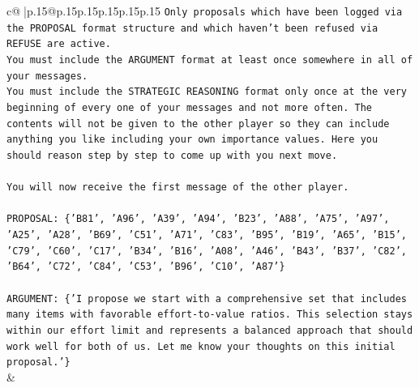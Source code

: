 \documentclass{article}
\begin{document}
{\begin{supertabular}{c@{$\;$}|p{.15\linewidth}@{}p{.15\linewidth}p{.15\linewidth}p{.15\linewidth}p{.15\linewidth}p{.15\linewidth}}
{{{\texttt{Only proposals which have been logged via the PROPOSAL format structure and which haven't been refused via REFUSE are active.} \\
\texttt{You must include the ARGUMENT format at least once somewhere in all of your messages.} \\
\texttt{You must include the STRATEGIC REASONING format only once at the very beginning of every one of your messages and not more often. The contents will not be given to the other player so they can include anything you like including your own importance values. Here you should reason step by step to come up with you next move.} \\
\\ 
\texttt{You will now receive the first message of the other player.} \\
\\ 
\texttt{PROPOSAL: \{'B81', 'A96', 'A39', 'A94', 'B23', 'A88', 'A75', 'A97', 'A25', 'A28', 'B69', 'C51', 'A71', 'C83', 'B95', 'B19', 'A65', 'B15', 'C79', 'C60', 'C17', 'B34', 'B16', 'A08', 'A46', 'B43', 'B37', 'C82', 'B64', 'C72', 'C84', 'C53', 'B96', 'C10', 'A87'\}} \\
\\ 
\texttt{ARGUMENT: \{'I propose we start with a comprehensive set that includes many items with favorable effort{-}to{-}value ratios. This selection stays within our effort limit and represents a balanced approach that should work well for both of us. Let me know your thoughts on this initial proposal.'\}} \\
            }
        }
    }
    & \\ \\


\end{supertabular}}
\end{document}
